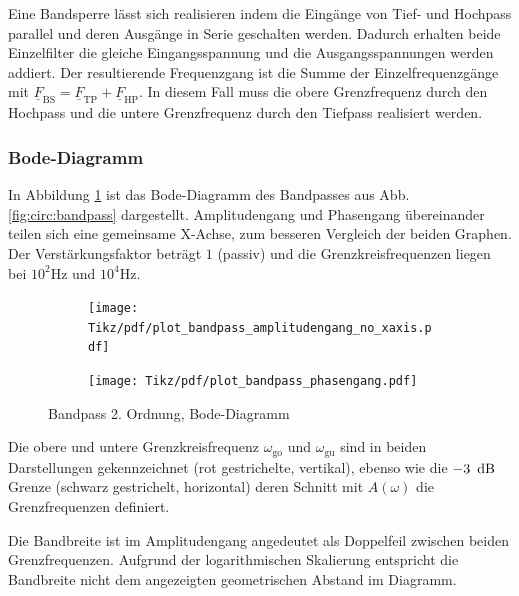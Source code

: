 \begin{frame}
{    Eine Bandsperre lässt sich realisieren indem die Eingänge von Tief- und Hochpass parallel und deren Ausgänge in Serie geschalten werden.
    Dadurch erhalten beide Einzelfilter die gleiche Eingangsspannung und die Ausgangsspannungen werden addiert.
    Der resultierende Frequenzgang ist die Summe der Einzelfrequenzgänge mit $\underline{F}_{\mathrm{BS}} = \underline{F}_{\mathrm{TP}} + \underline{F}_{\mathrm{HP}}$.
    In diesem Fall muss die obere Grenzfrequenz durch den Hochpass und die untere Grenzfrequenz durch den Tiefpass realisiert werden.



    \subsubsection{Bode-Diagramm}
    In Abbildung \ref{plot:bandpass:bode} ist das Bode-Diagramm des Bandpasses aus Abb. \ref{fig:circ:bandpass} dargestellt.
    Amplitudengang und Phasengang übereinander teilen sich eine gemeinsame X-Achse, zum besseren Vergleich der beiden Graphen.
    Der Verstärkungsfaktor beträgt $1$ (passiv) und die Grenzkreisfrequenzen liegen bei $10^2\mathrm{Hz}$ und $10^4\mathrm{Hz}$.

    \begin{figure}[h]\centering
        \begin{subfigure}{\textwidth}\centering
            \texttt{[image: Tikz/pdf/plot\_bandpass\_amplitudengang\_no\_xaxis.pdf]}
        \end{subfigure}\newline
        \begin{subfigure}{\textwidth}\centering
            \texttt{[image: Tikz/pdf/plot\_bandpass\_phasengang.pdf]}
        \end{subfigure}
        \caption{Bandpass 2. Ordnung, Bode-Diagramm}
        \label{plot:bandpass:bode}
    \end{figure}

    Die obere und untere Grenzkreisfrequenz $\omega_{\mathrm{go}}$ und $\omega_{\mathrm{gu}}$ sind
    in beiden Darstellungen gekennzeichnet (rot gestrichelte, vertikal),
    ebenso wie die $-3\ \operatorname{dB}$ Grenze (schwarz gestrichelt, horizontal)
    deren Schnitt mit $A(\omega)$ die Grenzfrequenzen definiert.
    
    Die Bandbreite ist im Amplitudengang angedeutet als Doppelfeil zwischen beiden Grenzfrequenzen.
    Aufgrund der logarithmischen Skalierung entspricht die Bandbreite nicht dem angezeigten geometrischen Abstand im Diagramm.

}
\end{frame}
